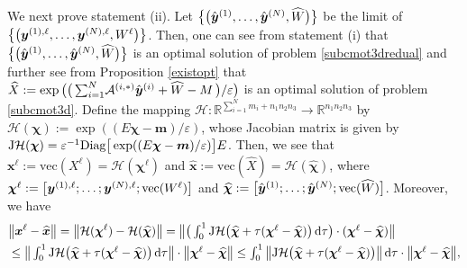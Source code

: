 \documentclass[10pt]{article}
\newcommand{\cA}{{\cal A}}
\begin{document}
\begin{appendices}
We next prove statement (ii). Let $\big{\{}\big{(}\hat{\bm{y}}^{(1)},\dots,\hat{\bm{y}}^{(N)},\widehat{W}\big{)}\big{\}}$ be the limit of %
$\big{\{}\big{(}\bm{y}^{(1),\ell},\dots,\bm{y}^{(N),\ell},W^{\ell}\big{)}\big{\}}$. Then, one can see from statement (i) that $\big{\{}\big{(}\hat{\bm{y}}^{(1)},\dots,\hat{\bm{y}}^{(N)},\widehat{W} \big{)}\big{\}}$ is an optimal solution of problem \eqref{subcmot3dredual} and further see from Proposition \ref{existopt} that $\widehat{X} := \exp\big{(}\big{(}\, {\textstyle\sum_{i = 1}^N} \cA^{(i,*)}\hat{\bm{y}}^{(i)}+\widehat{W}-M\,\big{)}/\varepsilon\big{)}$
is an optimal solution of problem \eqref{subcmot3d}. Define the mapping $\mathcal{H}: \mathbb{R}^{\sum^N_{i=1}m_i + n_1n_2n_3}\to\mathbb{R}^{n_1n_2n_3}$ by $\mathcal{H}(\bm{\chi}):=\exp((E\bm{\chi}-\bm{m})/\varepsilon)$, whose Jacobian matrix is given by $\mathrm{J}\mathcal{H}(\bm{\chi})=\varepsilon^{-1}\mathrm{Diag}\big{[}\exp((E\bm{\chi}-\bm{m})/\varepsilon)\big{]}E$.
Then, we see that $\bm{x}^\ell:=\mathrm{vec}(X^{\ell})=\mathcal{H}(\bm{\chi}^\ell)$ and $\hat{\bm{x}} :=\mathrm{vec}(\widehat{X})=\mathcal{H}(\widehat{\bm{\chi}})$, where $\bm{\chi}^\ell := \big{[}\bm{y}^{(1),\ell}; \dots; \bm{y}^{(N),\ell}; \mathrm{vec}(W^\ell)\big{]}$ and
$\widehat{\bm{\chi}} := \big{[}\hat{\bm{y}}^{(1)}; \dots; \hat{\bm{y}}^{(N)}; \mathrm{vec}(\widehat{W})\big{]}$. Moreover, we have
\begin{equation}\label{bdbydual}
\begin{aligned}
&\big{\|}\bm{x}^\ell-\widehat{\bm{x}} \big{\|}
= \big{\|}\mathcal{H}(\bm{\chi}^\ell)-\mathcal{H}(\widehat{\bm{\chi}})\big{\|}
= {\textstyle\big\|\big(\int^1_0\mathrm{J}\mathcal{H}\big(\widehat{\bm{\chi}}  + \tau (\bm{\chi}^\ell-\widehat{\bm{\chi}})\big)
\,\mathrm{d}\tau \big)\cdot(\bm{\chi}^\ell-\widehat{\bm{\chi}} )\big\|}  \\
&\leq {\textstyle\big\|\int^1_0\mathrm{J}\mathcal{H}\big{(}\widehat{\bm{\chi}} + \tau (\bm{\chi}^\ell-\widehat{\bm{\chi}})\big{)}
\,\mathrm{d}\tau \big\|\cdot\big{\|}\bm{\chi}^\ell-\widehat{\bm{\chi}}\big{\|}}
\leq {\textstyle\int^1_0\big\|\mathrm{J}\mathcal{H}\big{(}\widehat{\bm{\chi}} + \tau (\bm{\chi}^\ell-\widehat{\bm{\chi}})\big{)}
\big\|\,\mathrm{d}\tau \cdot\big{\|}\bm{\chi}^\ell-\widehat{\bm{\chi}} \big{\|}},

\end{aligned}
\end{equation}
\end{appendices}
\end{document}
